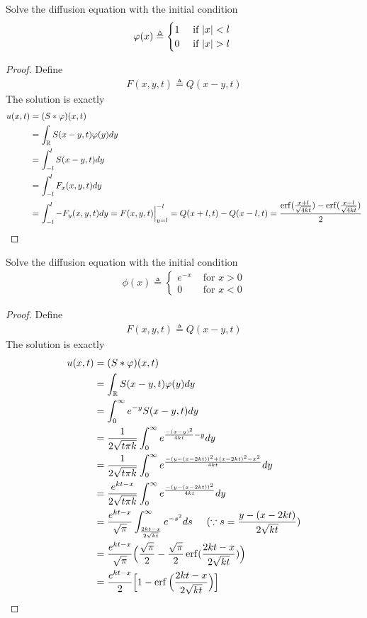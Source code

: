 \documentclass{report}
\begin{document}
\begin{question}{}{}
Solve the diffusion equation with the initial condition 
\begin{align*}
\phi (x)\triangleq \begin{cases}
 1& \text{ if $\abso{x}<l$ }\\
 0& \text{ if $\abso{x}>l$ } 
\end{cases}
\end{align*}
\end{question}
\begin{proof}
Define 
\begin{align*}
F(x,y,t)\triangleq Q(x-y,t)
\end{align*}
The solution is exactly 
\begin{align*}
u(x,t)&= (S*\varphi )(x,t)\\
&=\int_{\mathbb{R}}S(x-y,t)\varphi (y)dy \\
&=\int_{-l}^{l} S(x-y,t)dy \\
&=\int_{-l}^{l}F_x(x,y,t)dy \\
&=\int_{-l}^{l}-F_y(x,y,t)dy=F(x,y,t)\Big|_{y=l}^{-l}=Q(x+l,t)-Q(x-l,t)=\frac{\operatorname{erf}(\frac{x+l}{\sqrt{4kt}})-\operatorname{erf}(\frac{x-l}{\sqrt{4kt}})}{2}
\end{align*}
\end{proof}
\begin{question}{}{}
Solve the diffusion equation with the initial condition 
\begin{align*}
  \phi (x)\triangleq \begin{cases}
    e^{-x}&\text{ for }x>0 \\
    0&\text{ for }x<0
  \end{cases}
\end{align*}
\end{question}
\begin{proof}
Define 
 \begin{align*}
F(x,y,t)\triangleq Q(x-y,t)
\end{align*}
The solution is exactly 
\begin{align*}
u(x,t)&=(S*\varphi)(x,t)\\
&=\int_{\mathbb{R}}S(x-y,t)\varphi (y)dy\\
&=\int_0^{\infty}e^{-y}S(x-y,t)dy\\
&=\frac{1}{2\sqrt{t\pi k} }\int_0^{\infty} e^{\frac{-(x-y)^2}{4kt}-y} dy  \\
&=\frac{1}{2\sqrt{t \pi k}}\int_0^{\infty} e^{\frac{-(y-(x-2kt))^2+ (x-2kt)^2-x^2}{4kt}}dy \\
&=\frac{e^{kt-x}}{2\sqrt{t \pi k} }\int_0^{\infty} e^{\frac{-(y-(x-2kt))^2}{4kt}}dy \\
&=\frac{e^{kt-x}}{\sqrt{ \pi } }\int_{\frac{2kt-x}{2\sqrt{kt}}}^{\infty} e^{-s^2}ds\hspace{0.5cm}(\because s= \frac{y-(x-2kt)}{2\sqrt{kt} }) \\
&=\frac{e^{kt-x}}{\sqrt{ \pi } }\Big( \frac{\sqrt{\pi} }{2}- \frac{\sqrt{\pi} }{2}\operatorname{erf}(\frac{2kt-x}{2\sqrt{kt} }) \Big)\\
&=\frac{e^{kt-x}}{2}\Big[1-\operatorname{erf}\Big(\frac{2kt-x}{2\sqrt{kt}} \Big) \Big]
\end{align*}
\end{proof}
\end{document}
